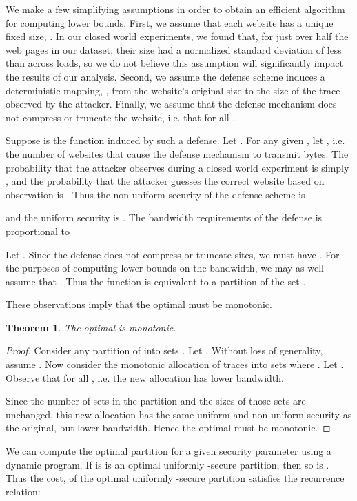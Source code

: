 \documentclass[10pt,journal]{IEEEtran}
\newtheorem{theorem}{Theorem}
\begin{document}
We make a few simplifying assumptions in order to obtain an efficient
algorithm for computing lower bounds.  First, we assume that each
website has a unique fixed size, .  In our closed world
experiments, we found that, for just over half the web pages in our
dataset, their size had a normalized standard deviation of less than
 across  loads, so we do not believe this assumption will
significantly impact the results of our analysis.  Second, we assume
the defense scheme induces a deterministic mapping, , from
the website's original size to the size of the trace observed by the
attacker.  Finally, we assume that the defense mechanism does not
compress or truncate the website, i.e. that  for all .

Suppose  is the function induced by such a defense.  Let
.  For any given , let
, i.e. the number of websites that cause the defense
mechanism to transmit  bytes.  The probability that the attacker
observes  during a closed world experiment is simply , and
the probability that the attacker guesses the correct website based on
observation  is .  Thus the non-uniform security of the
defense scheme is

and the uniform security is .  The bandwidth requirements of
the defense is proportional to

Let .  Since the defense does not compress or truncate
sites, we must have .  For the purposes of computing
lower bounds on the bandwidth, we may as well assume that .
Thus the function  is equivalent to a partition of the set
.

These observations imply that the optimal  must be monotonic.
\begin{theorem}\label{th:contiguous}
  The optimal  is monotonic.
\end{theorem}
\begin{proof}
Consider any partition of  into sets .  Let . Without loss of generality,
assume . Now consider the monotonic
allocation of traces into sets  where . Let . Observe that  for all , i.e. the new allocation has lower bandwidth.

Since the number of sets in the partition and the sizes of those sets
are unchanged, this new allocation has the same uniform and
non-uniform security as the original, but lower bandwidth.  Hence the
optimal  must be monotonic.
\end{proof}

We can compute the optimal partition for a given security parameter
using a dynamic program.  If  is is an optimal
uniformly -secure partition, then so is .
Thus the cost,  of the optimal uniformly
-secure partition satisfies the recurrence relation:
\end{document}
